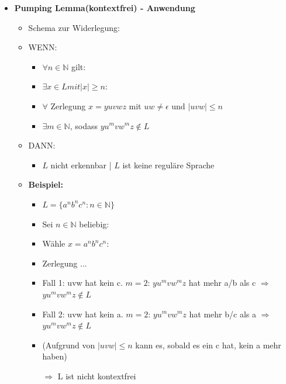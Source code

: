 \documentclass[11pt,a4paper]{article}
\begin{document}
\begin{itemize}
\item {\large \textbf{Pumping Lemma(kontextfrei) - Anwendung}}
	\begin{itemize}
	\item Schema zur Widerlegung:
	\item WENN: 
		\begin{itemize}
		\item $\forall n \in \mathbb{N}$ gilt:
		\item $\exists x \in L mit |x| \geq n$:
		\item $\forall$ Zerlegung $x=yuvwz$ mit $uw \neq \epsilon$ und $|uvw| \leq n$
		\item $\exists m \in \mathbb{N}$, sodass $yu^mvw^mz \notin L$
		\end{itemize}
	\item DANN: 
		\begin{itemize}
		\item $L$ nicht erkennbar | $L$ ist keine reguläre Sprache
		\end{itemize}
	\item[]
	\item \textbf{Beispiel:}
		\begin{itemize}
		\item $L=\{a^nb^nc^n: n \in \mathbb{N}\}$
		\item Sei $n \in \mathbb{N}$ beliebig:
		\item Wähle $x = a^nb^nc^n$:
		\item Zerlegung ...
		\item Fall 1: uvw hat kein c. $m=2$: $yu^mvw^mz$ hat mehr a/b als c $\Rightarrow$ $yu^mvw^mz \notin L$
		\item Fall 2: uvw hat kein a. $m=2$: $yu^mvw^mz$ hat mehr b/c als a $\Rightarrow$ $yu^mvw^mz \notin L$
		\item (Aufgrund von $|uvw| \leq n$ kann es, sobald es ein c hat, kein a mehr haben)
		\item[$\Rightarrow$] L ist nicht kontextfrei
		\end{itemize}
	\end{itemize}

\pagebreak


\end{itemize}
\end{document}

